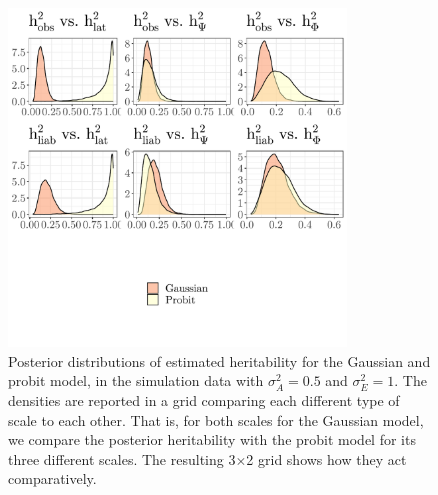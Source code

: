 \begin{figure}
    \centering
    \includegraphics[width=0.8\textwidth]{figures/grid_simulation_gaussian_vs_binom.pdf}
    \caption[Posterior heritability for simulation data in different scales]{Posterior distributions of estimated heritability for the Gaussian and probit model, in the simulation data with $\sigma^2_A=0.5$ and $\sigma^2_E=1$. The densities are reported in a grid comparing each different type of scale to each other. That is, for both scales for the Gaussian model, we compare the posterior heritability with the probit model for its three different scales. The resulting 3$\times$2 grid shows how they act comparatively.}
    \label{fig:simulatino gaussian vs binomial}
\end{figure}

